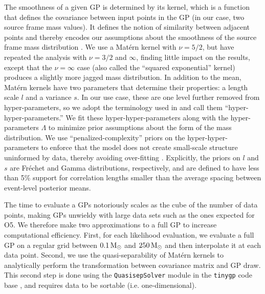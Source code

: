 \documentclass[preprint2,linenumbers]{aastex631}
\begin{document}
The smoothness of a given \ac{GP} is determined by its kernel, which is a function that defines the covariance between input points in the \ac{GP} (in our case, two source frame mass values). 
It defines the notion of similarity between adjacent points and thereby encodes our assumptions about the smoothness of the source frame mass distribution \citep{rasmussen_gaussian_2006}.
We use a Mat\'ern kernel \citep{handcock_bayesian_1993, stein_interpolation_1999} with $\nu = 5/2$, but have repeated the analysis with $\nu=3/2$ and $\infty$, finding little impact on the results, except that the $\nu=\infty$ case (also called the ``squared exponential'' kernel) produces a slightly more jagged mass distribution.
In addition to the mean, Mat\'ern kernels have two parameters that determine their properties: a length scale $l$ and a variance $s$.
In our use case, these are one level further removed from hyper-parameters, so we adopt the terminology used in \citet{callister_parameter-free_2023} and call them ``hyper-hyper-parameters.''
We fit these hyper-hyper-parameters along with the hyper-parameters $\Lambda$ to minimize prior assumptions about the form of the mass distribution.
We use ``penalized-complexity'' priors on the hyper-hyper-parameters to enforce that the model does not create small-scale structure uninformed by data, thereby avoiding over-fitting \citep{simpson_penalising_2017,simpson_garcpas_2022}. 
Explicitly, the priors on $l$ and $s$ are Fr\'echet and Gamma distributions, respectively, and are defined to have less than 5\% support for correlation lengths smaller than the average spacing between event-level posterior means.

The time to evaluate a \acp{GP} notoriously scales as the cube of the number of data points, making \acp{GP} unwieldy with large data sets such as the ones expected for \ac{O5}.
We therefore make two approximations to a full \ac{GP} to increase computational efficiency.
First, for each likelihood evaluation, we evaluate a full \ac{GP} on a regular grid between $0.1\,\text{M}_{\odot}$ and $250\,\text{M}_{\odot}$ and then interpolate it at each data point.
Second, we use the quasi-separability of Mat\'ern kernels to analytically perform the transformation between covariance matrix and \ac{GP} draw.
This second step is done using the \texttt{QuasisepSolver} module \citep{foreman-mackey_fast_2017} in the \texttt{tinygp} code base \citep{foreman-mackey_tinygp_2021}, and requires data to be sortable (i.e. one-dimensional).
\end{document}

